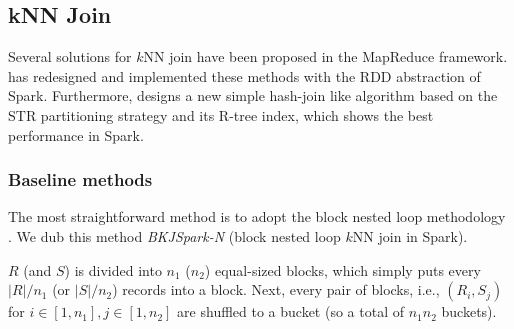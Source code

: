 
\subsection{kNN Join}
\label{sub:knnjoin}
Several solutions \cite{bcknnj, feifeiknnj} for $k$NN join have been
proposed in the MapReduce framework. \name has redesigned and
implemented these methods with the RDD abstraction of
Spark. Furthermore, \name designs a new simple hash-join like
algorithm based on the STR partitioning strategy and its R-tree index,
which shows the best performance in Spark. %

\subsubsection{Baseline methods}
\label{subsub:bnlj}
The most straightforward method is to adopt the block nested loop
methodology \cite{feifeiknnj}. We dub this method \emph{BKJSpark-N}
(block nested loop $k$NN join in Spark).

 $R$ (and $S$) is divided into $n_1$
($n_2$) equal-sized blocks, which simply puts every $|R|/n_1$ (or
$|S|/n_2$) records into a block. Next, every pair of blocks, i.e.,
$(R_i, S_j)$ for $i\in[1, n_1], j\in [1, n_2]$ are shuffled to a
bucket (so a total of $n_1n_2$ buckets). %

